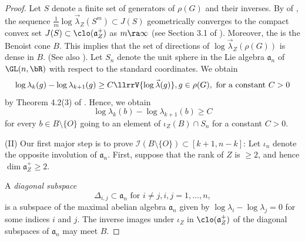 \begin{proof}
Let $S$ denote a finite set of generators of $\rho(G)$ and their inverses. 
 By  of \cite{BS2021}, the sequence
 $\frac{1}{m} \log\vec{\lambda}_Z(S^m)\subset J(S)$ geometrically converges to 
 the compact convex set $J(S) \subset\clo(\mathfrak{a}_Z^+)$  as $m \ra \infty$ 
 (see Section 3.1 of \cite{BS2021}).
Moreover, the  is the Benoist cone $B$. 
This implies that the set of directions of 
 $\log \vec{\lambda}_Z(\rho(G))$
 is dense in  $B$. (See also \cite{Benoist98}). 
 Let $S_n$ denote the unit sphere in the Lie algebra $\mathfrak{a}_n$ of $\GL(n, \bR)$
with respect to the standard coordinates.
 We obtain
 \[\log \lambda_k(g) -\log \lambda_{k+1}(g) \geq C \llrrV{\log \vec{\lambda}(g)}, g \in \rho(G),
 \hbox{ for a constant } C> 0 \]
 by Theorem 4.2(3) of \cite{GGKW17ii}. 
Hence, we obtain
 \begin{equation} \label{eqn:lklkpC} 
 	\log \lambda_k(b) -\log \lambda_{k+1}(b) \geq C 
 \end{equation} 
for every $b  \in B \setminus \{O\}$ going to an element of $\iota_Z(B) \cap S_n$ 
for a constant $C> 0$.
	 
	    (II) Our first major step is to prove
	 $\mathcal{I}(B \setminus \{O\}) \subset [k+1, n-k]$: 
	  Let $\iota_n$ denote the opposite involution of $\mathfrak{a}_n$. %
First, suppose that the rank of $Z$ is $\geq 2$, and hence
$\dim \mathfrak{a}_Z^+ \geq 2$. 

	
A {\em diagonal subspace }
\[\Delta_{i, j} \subset \mathfrak{a}_n \text{ for } i\ne j, 
i, j=1, \dots, n,\] 
is a subspace of the maximal abelian algebra
$\mathfrak{a}_n$ given by 
$\log\lambda_i - \log\lambda_j=0$ for some indices $i$ and $j$. 
	The inverse images under $\iota_Z$ in $\clo(\mathfrak{a}_Z^+)$ of the 
	diagonal subspaces of $\mathfrak{a}_n$ may meet $B$. 


\end{proof}
